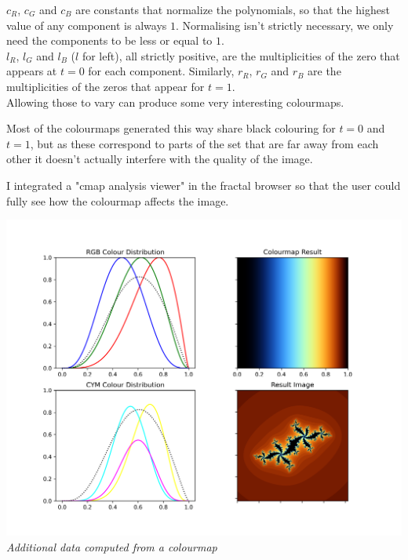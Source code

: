 \documentclass{article}
\begin{document}
$c_R$, $c_G$ and $c_B$ are constants that normalize the polynomials, so that the highest value of any component is always $1$. Normalising isn't strictly necessary, we only need the components to be less or equal to $1$. \\
\vspace{5mm}
$l_R$, $l_G$ and $l_B$ ($l$ for left), all strictly positive, are the multiplicities of the zero that appears at $t = 0$ for each component. Similarly, $r_R$, $r_G$ and $r_B$ are the multiplicities of the zeros that appear for $t = 1$. \\
Allowing those to vary can produce some very interesting colourmaps. \\
\vspace{5mm}

Most of the colourmaps generated this way share black colouring for $t = 0$ and $t = 1$, but as these correspond to parts of the set that are far away from each other it doesn't actually interfere with the quality of the image. \\
\vspace{5mm}

I integrated a "cmap analysis viewer" in the fractal browser so that the user could fully see how the colourmap affects the image. \\

\begin{center}
\includegraphics[scale=0.4]{report_params} \\
\textit{Additional data computed from a colourmap}
\end{center}
\end{document}

